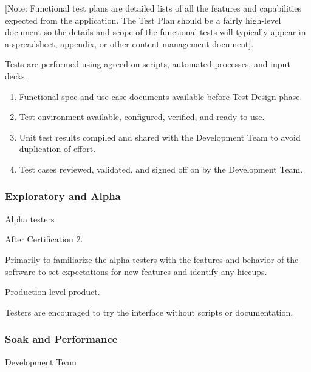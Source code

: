 \documentclass[letterpaper,10pt,english]{sphinxmanual}
\begin{document}
 {[}Note: Functional test plans are detailed lists of all the features and capabilities expected from the application.  The Test Plan should be a fairly high-level document so the details and scope of the functional tests will typically appear in a spreadsheet, appendix, or other content management document{]}.

 Tests are performed using agreed on scripts, automated processes, and input decks.

\begin{enumerate}
\def\theenumi{\arabic{enumi}}
\def\labelenumi{\theenumi .}
\makeatletter\def\p@enumii{\p@enumi \theenumi .}\makeatother
\item {} 
Functional spec and use case documents available before Test Design phase.

\item {} 
Test environment available, configured, verified, and ready to use.

\item {} 
Unit test results compiled and shared with the Development Team to avoid duplication of effort.

\item {} 
Test cases reviewed, validated, and signed off on by the Development Team.

\end{enumerate}


\subsubsection{Exploratory and Alpha}
\label{\detokenize{test_plan/strategy:exploratory-and-alpha}}
 Alpha testers

 After Certification 2.

 Primarily to familiarize the alpha testers with the features and behavior of the software to set expectations for new features and identify any hiccups.

 Production level product.

 Testers are encouraged to try the interface without scripts or documentation.


\subsubsection{Soak and Performance}
\label{\detokenize{test_plan/strategy:soak-and-performance}}
 Development Team
\end{document}
